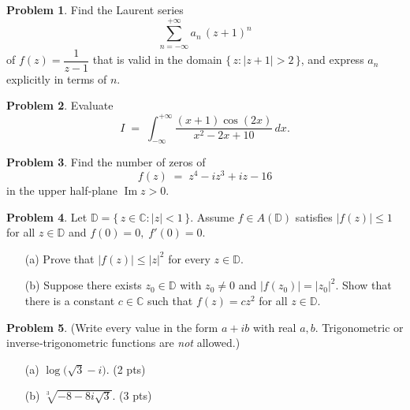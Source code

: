 \documentclass[10pt]{article}
\theoremstyle{definition} %
\newtheorem{problem}{Problem}
\theoremstyle{plain} %
\begin{document}
                \begin{problem}
                Find the Laurent series
                \[
                  \sum_{n=-\infty}^{+\infty} a_{n}\,(z+1)^{n}
                \]
                of \(f(z)=\dfrac{1}{z-1}\) that is valid in the domain \(\{\,z : |z+1|>2\,\}\), and express \(a_{n}\) explicitly in terms of \(n\).
                \end{problem}
                \begin{problem}
                  Evaluate
                  \[
                    I \;=\; \int_{-\infty}^{+\infty} \frac{(x+1)\cos(2x)}{x^{2}-2x+10}\,dx.
                  \]
                  \end{problem}
                  \begin{problem}
                    Find the number of zeros of
                    \[
                      f(z)\;=\;z^{4}-i z^{3}+i z-16
                    \]
                    in the upper half‑plane \(\operatorname{Im}z>0\).
                    \end{problem}
                    \begin{problem}
                      Let \(\mathbb{D}=\{\,z\in\mathbb{C} : |z|<1\,\}\).  
                      Assume \(f\in A(\mathbb{D})\) satisfies \(|f(z)|\le 1\) for all \(z\in\mathbb{D}\) and \(f(0)=0,\;f'(0)=0\).
                      
                      \begin{enumerate}\itemsep6pt
                        \item[(a)] Prove that \(|f(z)|\le |z|^{2}\) for every \(z\in\mathbb{D}\).
                        \item[(b)] Suppose there exists \(z_{0}\in\mathbb{D}\) with \(z_{0}\neq 0\) and \(|f(z_{0})| = |z_{0}|^{2}\).
                              Show that there is a constant \(c\in\mathbb{C}\) such that \(f(z)=cz^{2}\) for all \(z\in\mathbb{D}\).
                      \end{enumerate}
                      \end{problem}
                      \begin{problem}
                        (Write every value in the form \(a+ib\) with real \(a,b\).  
                        Trigonometric or inverse‑trigonometric functions are \emph{not} allowed.)
                        \begin{enumerate}\itemsep4pt
                          \item[(a)] \(\log\!\bigl(\sqrt{3}-i\bigr)\). \hfill (2 pts)
                          \item[(b)] \(\displaystyle \sqrt[3]{-8-8i\sqrt{3}}\). \hfill (3 pts)
                        \end{enumerate}
                        \end{problem}
                        
\end{document}
